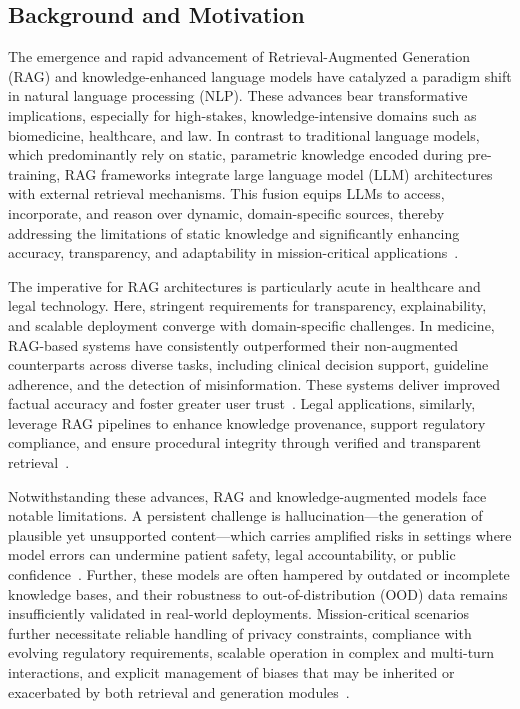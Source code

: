 \subsection{Background and Motivation}

The emergence and rapid advancement of Retrieval-Augmented Generation (RAG) and knowledge-enhanced language models have catalyzed a paradigm shift in natural language processing (NLP). These advances bear transformative implications, especially for high-stakes, knowledge-intensive domains such as biomedicine, healthcare, and law. In contrast to traditional language models, which predominantly rely on static, parametric knowledge encoded during pre-training, RAG frameworks integrate large language model (LLM) architectures with external retrieval mechanisms. This fusion equips LLMs to access, incorporate, and reason over dynamic, domain-specific sources, thereby addressing the limitations of static knowledge and significantly enhancing accuracy, transparency, and adaptability in mission-critical applications~\cite{ref4,ref5,ref10,ref14,ref15,ref16,ref17,ref46,ref47,ref48,ref51,ref52,ref54,ref55,ref64}.

The imperative for RAG architectures is particularly acute in healthcare and legal technology. Here, stringent requirements for transparency, explainability, and scalable deployment converge with domain-specific challenges. In medicine, RAG-based systems have consistently outperformed their non-augmented counterparts across diverse tasks, including clinical decision support, guideline adherence, and the detection of misinformation. These systems deliver improved factual accuracy and foster greater user trust~\cite{ref1,ref2,ref3,ref4,ref5,ref6,ref7,ref8,ref29,ref31,ref42,ref48,ref51,ref52,ref54,ref55,ref63}. Legal applications, similarly, leverage RAG pipelines to enhance knowledge provenance, support regulatory compliance, and ensure procedural integrity through verified and transparent retrieval~\cite{ref4,ref5,ref8,ref10,ref14,ref16}.

Notwithstanding these advances, RAG and knowledge-augmented models face notable limitations. A persistent challenge is hallucination—the generation of plausible yet unsupported content—which carries amplified risks in settings where model errors can undermine patient safety, legal accountability, or public confidence~\cite{ref15,ref38,ref45,ref46,ref47,ref50,ref52,ref54,ref55,ref64}. Further, these models are often hampered by outdated or incomplete knowledge bases, and their robustness to out-of-distribution (OOD) data remains insufficiently validated in real-world deployments. Mission-critical scenarios further necessitate reliable handling of privacy constraints, compliance with evolving regulatory requirements, scalable operation in complex and multi-turn interactions, and explicit management of biases that may be inherited or exacerbated by both retrieval and generation modules~\cite{ref15,ref38,ref45,ref46,ref47,ref50,ref52,ref54,ref55,ref64}.

